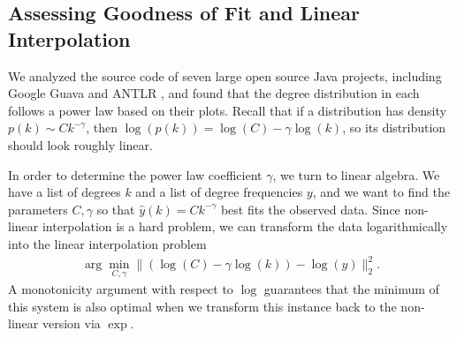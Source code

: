 \documentclass[11pt,a4paper,twocolumn]{article}
\begin{document}
\begin{singlespace}
\subsection{Assessing Goodness of Fit and Linear Interpolation}

We analyzed the source code of seven large open source Java projects, including
Google Guava \cite{Guava} and ANTLR \cite{ANTLR}, and found that the degree distribution in each follows
a power law based on their  plots. Recall that if a distribution has
density $p(k)\sim Ck^{-\gamma}$, then $\log(p(k))=\log(C)-\gamma\log(k)$, so
its distribution should look roughly linear.

In order to determine the power law coefficient $\gamma$, we turn to linear
algebra. We have a list of degrees $k$ and a list of degree frequencies $y$,
and we want to find the parameters $C,\gamma$ so that $\hat{y}(k)=Ck^{-\gamma}$
best fits the observed data. Since non-linear interpolation is a hard problem,
we can transform the data logarithmically into the linear interpolation
problem
\begin{align}
\label{eq:linint}
\arg\min_{C,\gamma} \|(\log(C)-\gamma\log(k))-\log(y)\|_2^2.
\end{align}
A monotonicity argument with respect to $\log$ guarantees that the minimum
of this system is also optimal when we transform this instance back to the
non-linear version via $\exp$.


\end{singlespace}
\end{document}
